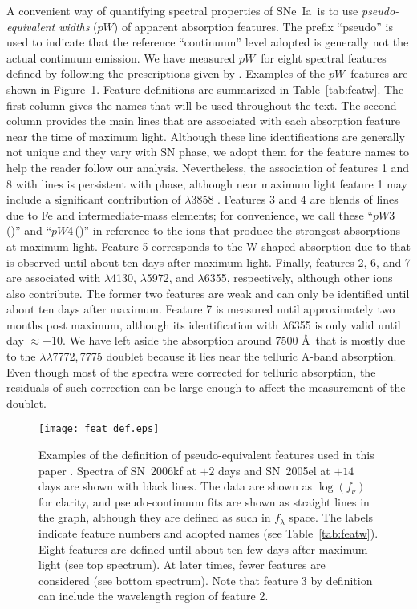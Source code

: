 \documentclass[apj]{emulateapj-rtx4}
\newcommand{\ew}{$pW$}
\newcommand{\pwthree}{$pW$3\,(\ion{Mg}{2})}
\newcommand{\pwfour}{$pW$4\,(\ion{Fe}{2})}
\newcommand{\sneia}{SNe~Ia}
\begin{document}
A convenient way of quantifying spectral properties of \sneia\ is to
use {\em pseudo-equivalent widths} (\ew) of apparent absorption features. The
prefix ``pseudo'' is used to indicate that the reference ``continuum''
level adopted is generally not the actual continuum emission. We have
measured \ew\ for eight spectral features defined by
\citet{folatelli04} following the prescriptions 
given by \citet{garavini07}. Examples of the \ew\ features are shown in
Figure~\ref{fig:featdef}. Feature definitions are summarized in
Table~\ref{tab:featw}. The first column gives the names that will be
used throughout the text. The second column provides the main lines that
are associated with each absorption feature near the time of maximum
light. Although these line identifications are generally not unique and they
vary with SN phase, we adopt them for the feature names to help the
reader follow our analysis. Nevertheless, the association of features
1 and 8 with  lines is persistent with phase, although
  near maximum light feature 1 may include a significant contribution
  of  $\lambda$3858 \citep[see][]{blondin12}. Features 3 and 4 are
blends of lines due to Fe and intermediate-mass elements; for convenience, we
call these ``\pwthree'' and ``\pwfour'' in
reference to the ions that produce the strongest absorptions at
maximum light. Feature 5 corresponds to the W-shaped absorption due to
 that is observed until about ten days after maximum
light. Finally, features 2, 6, and 7 are associated with 
$\lambda$4130, $\lambda$5972, and $\lambda$6355, respectively, although
other ions also contribute. The former two features are weak and can
only be identified until about ten days after maximum. Feature 7
is measured until approximately two months post maximum, although its
identification with  $\lambda$6355 is only valid until day
$\approx$+10. We have left aside the absorption around 7500 \AA\ that
is mostly due to the  $\lambda$$\lambda$7772,\,7775
  doublet because it lies near the telluric A-band absorption. Even
  though most of the spectra were corrected for telluric absorption,
  the residuals of such correction can be large enough to affect the
  measurement of the  doublet. 

\begin{figure}[htpb]%
\texttt{[image: feat\_def.eps]}
\caption{Examples of the definition of pseudo-equivalent features used
  in this paper \citep[see also][]{garavini07}. Spectra of
  SN~2006kf at $+2$ days and SN~2005el at $+14$ days are shown with
  black lines. The data are shown
  as $\log(f_\nu)$ for clarity, and pseudo-continuum
  fits are shown as straight lines in the graph, although
  they are defined as such in $f_\lambda$ space. The labels indicate
  feature numbers and adopted names (see Table~\ref{tab:featw}). Eight
  features are defined until about ten few days after maximum light
  (see top spectrum). At later times, fewer features are considered
  (see bottom spectrum). Note that feature 3 by definition
  can include the wavelength region of feature 2.\label{fig:featdef}}   
\end{figure}
\end{document}

